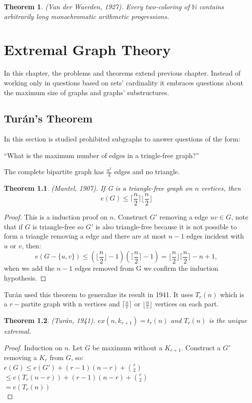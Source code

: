 \documentclass[12pt,twoside,a4paper]{book}
\numberwithin{equation}{section}
\newtheorem{theorem}             {Theorem}[section]
\theoremstyle{remark}
\begin{document}
\begin{theorem} (Van der Waerden, 1927). Every two-coloring of $\mathbb{N}$ contains arbitrarily long monochromatic arithmetic progressions.
\end{theorem}
\chapter{Extremal Graph Theory}
In this chapter, the problems and theorems extend previous chapter. Instead of working only in questions based on sets' cardinality it embraces questions about the maximum size of graphs and graphs' substructures.
\section{Turán's Theorem}
In this section is studied prohibited subgraphs to answer questions of the form: 
\begin{center}``What is the maximum number of edges in a tringle-free graph?''\end{center}
The complete bipartite graph has $\frac{n^{2}}{4}$ edges and no triangle.\\
\begin{theorem}
(Mantel, 1907). If G is a triangle-free graph on $n$ vertices, then 
$$e(G) \leq \lceil \frac{n}{2} \rceil \lfloor \frac{n}{2} \rfloor $$
\end{theorem}
\begin{proof}
This is a induction proof on $n$. Construct $G'$ removing a edge $uv \in G$, note that if $G$ is triangle-free so $G'$ is also triangle-free because it is not possible to form a triangle removing a edge and there are at most $n-1$ edges incident with $u$ or $v$, then:
$$e(G-\{u,v\}) \leq (\lfloor \frac{n}{2} \rfloor -1)(\lceil \frac{n}{2} \rceil -1) = \lfloor \frac{n}{2} \rfloor \lceil \frac{n}{2} \rceil - n +1, $$
when we add the $n-1$ edges removed from G we confirm the induction hypothesis. 
\end{proof}

Turán used this theorem to generalize its result in 1941. It uses $T_r(n)$ which is  a $r-$partite graph with n vertices and $\lceil \frac{n}{r} \rceil$ or $\lfloor \frac{n}{r} \rfloor$ vertices on each part.

\begin{theorem} (Turán, 1941). $ex(n, k_{r+1}) = t_r(n)$ and $T_r(n)$ is the unique extremal.
\end{theorem}
\begin{proof}
Induction on $n$. Let $G$ be maximum without a $K_{r+1}$. Construct a $G'$ removing a $K_r$ from $G$, so:\\
$e(G) \leq e(G') + (r-1)(n-r) + \binom{r}{2}$\\
$\leq e(T_r(n-r)) +(r-1)(n-r) + \binom{r}{2}$\\
$= e(T_r(n))$\\
\end{proof}
\end{document}
